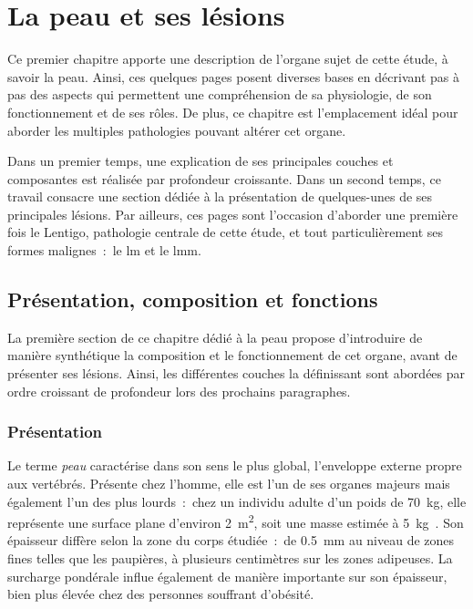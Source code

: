 \renewcommand{\thechapter}{\arabic{chapter}}
\setcounter{chapter}{0}

\chapter{La peau et ses lésions}
\label{chap:chapter_1}
\chapterintro
Ce premier chapitre apporte une description de l'organe sujet de cette étude, à savoir la peau. Ainsi, ces quelques pages posent diverses bases en décrivant pas à pas des aspects qui permettent une compréhension de sa physiologie, de son fonctionnement et de ses rôles. De plus, ce chapitre est l'emplacement idéal pour aborder les multiples pathologies pouvant altérer cet organe.\par

Dans un premier temps, une explication de ses principales couches et composantes est réalisée par profondeur croissante. Dans un second temps, ce travail consacre une section dédiée à la présentation de quelques-unes de ses principales lésions. Par ailleurs, ces pages sont l'occasion d'aborder une première fois le Lentigo, pathologie centrale de cette étude, et tout particulièrement ses formes malignes~:~le \acrlong{lm} et le \acrlong{lmm}.\par
\newpage

\section{Présentation, composition et fonctions}
La première section de ce chapitre dédié à la peau propose d'introduire de manière synthétique la composition et le fonctionnement de cet organe, avant de présenter ses lésions. Ainsi, les différentes couches la définissant sont abordées par ordre croissant de profondeur lors des prochains paragraphes.\par

\subsection{Présentation}
Le terme \textit{peau} caractérise dans son sens le plus global, l’enveloppe externe propre aux vertébrés. Présente chez l’homme, elle est l’un de ses organes majeurs mais également l’un des plus lourds~:~chez un individu adulte d’un poids de \SI{70}{\kilo\gram}, elle représente une surface plane d’environ \SI{2}{\metre\squared}, soit une masse estimée à \SI{5}{\kilo\gram}~\cite{McGrath2010}. Son épaisseur diffère selon la zone du corps étudiée~:~de \SI{0,5}{\milli\metre} au niveau de zones fines telles que les paupières, à plusieurs centimètres sur les zones adipeuses. La surcharge pondérale influe également de manière importante sur son épaisseur, bien plus élevée chez des personnes souffrant d'obésité.\par

